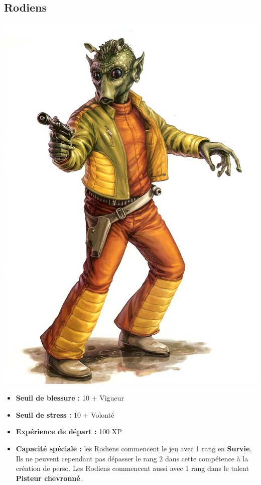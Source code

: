 \documentclass[twoside]{article}
\begin{document}
\subsection*{Rodiens}

\noindent\begin{minipage}{0.3\textwidth}
	\includegraphics[width=1\linewidth]{../img/species/rodien}
\end{minipage}%
\hfill%
\begin{minipage}{0.7\textwidth}\raggedleft
	\begin{itemize}
		\item \textbf{Seuil de blessure :} 10 + Vigueur 
		\item \textbf{Seuil de stress :} 10 + Volonté 
		\item \textbf{Expérience de départ :} 100 XP
		\item \textbf{Capacité spéciale :} les Rodiens commencent le jeu avec 1 rang en \textbf{Survie}. Ils ne peuvent cependant pas dépasser le rang 2 dans cette compétence à la création de perso. Les Rodiens commencent aussi avec 1 rang dans le talent \textbf{Pisteur chevronné}.
	\end{itemize}
\end{minipage}
\end{document}
